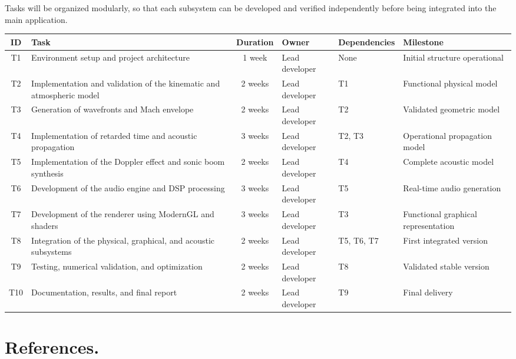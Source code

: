 \documentclass[10.5pt]{article}
\begin{document}
	Tasks will be organized modularly, so that each subsystem can be developed and verified independently before being integrated into the main application.
	
	\begin{table}[H]
		\centering
		\label{tab:planificacion}
		\small
		\begin{tabular}{|c|p{3.1cm}|c|p{2.5cm}|p{2.5cm}|p{2.5cm}|}
			\hline
			\textbf{ID} & \textbf{Task} & \textbf{Duration} &
			\textbf{Owner} & \textbf{Dependencies} &
			\textbf{Milestone} \\
			\hline
			T1 & Environment setup and project architecture &
			1 week & Lead developer & None &
			Initial structure operational \\
			\hline
			T2 & Implementation and validation of the kinematic and atmospheric model &
			2 weeks & Lead developer & T1 &
			Functional physical model \\
			\hline
			T3 & Generation of wavefronts and Mach envelope &
			2 weeks & Lead developer & T2 &
			Validated geometric model \\
			\hline
			T4 & Implementation of retarded time and acoustic propagation &
			3 weeks & Lead developer & T2, T3 &
			Operational propagation model \\
			\hline
			T5 & Implementation of the Doppler effect and sonic boom synthesis &
			2 weeks & Lead developer & T4 &
			Complete acoustic model \\
			\hline
			T6 & Development of the audio engine and DSP processing &
			3 weeks & Lead developer & T5 &
			Real-time audio generation \\
			\hline
			T7 & Development of the renderer using ModernGL and shaders &
			3 weeks & Lead developer & T3 &
			Functional graphical representation \\
			\hline
			T8 & Integration of the physical, graphical, and acoustic subsystems &
			2 weeks & Lead developer & T5, T6, T7 &
			First integrated version \\
			\hline
			T9 & Testing, numerical validation, and optimization &
			2 weeks & Lead developer & T8 &
			Validated stable version \\
			\hline
			T10 & Documentation, results, and final report &
			2 weeks & Lead developer & T9 &
			Final delivery \\
			\hline
		\end{tabular}
	\end{table}
	
	\newpage
	
	\section{References.}
	
	 
	
	
\end{document}
